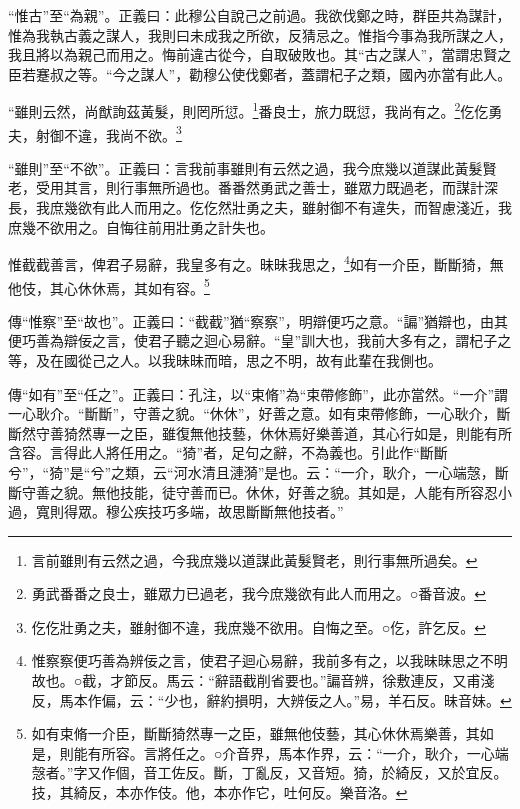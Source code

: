 {\noindent\shu{}\fzkt “惟古”至“為親”。正義曰：此穆公自說己之前過。我欲伐鄭之時，群臣共為謀計，惟為我執古義之謀人，我則曰未成我之所欲，反猜忌之。惟指今事為我所謀之人，我且將以為親己而用之。悔前違古從今，自取破敗也。其“古之謀人”，當謂忠賢之臣若蹇叔之等。“今之謀人”，勸穆公使伐鄭者，蓋謂杞子之類，國內亦當有此人。 \par}

“雖則云然，尚猷詢茲黃髮，則罔所愆。\footnote{言前雖則有云然之過，今我庶幾以道謀此黃髮賢老，則行事無所過矣。}番良士，旅力既愆，我尚有之。\footnote{勇武番番之良士，雖眾力已過老，我今庶幾欲有此人而用之。○番音波。}仡仡勇夫，射御不違，我尚不欲。\footnote{仡仡壯勇之夫，雖射御不違，我庶幾不欲用。自悔之至。○仡，許乞反。}


{\noindent\shu{}\fzkt “雖則”至“不欲”。正義曰：言我前事雖則有云然之過，我今庶幾以道謀此黃髮賢老，受用其言，則行事無所過也。番番然勇武之善士，雖眾力既過老，而謀計深長，我庶幾欲有此人而用之。仡仡然壯勇之夫，雖射御不有違失，而智慮淺近，我庶幾不欲用之。自悔往前用壯勇之計失也。 \par}

惟截截善言，俾君子易辭，我皇多有之。昧昧我思之，\footnote{惟察察便巧善為辨佞之言，使君子迴心易辭，我前多有之，以我昧昧思之不明故也。○截，才節反。馬云：“辭語截削省要也。”諞音辨，徐敷連反，又甫淺反，馬本作偏，云：“少也，辭約損明，大辨佞之人。”易，羊石反。昧音妹。}如有一介臣，斷斷猗，無他伎，其心休休焉，其如有容。\footnote{如有束脩一介臣，斷斷猗然專一之臣，雖無他伎藝，其心休休焉樂善，其如是，則能有所容。言將任之。○介音界，馬本作界，云：“一介，耿介，一心端愨者。”字又作個，音工佐反。斷，丁亂反，又音短。猗，於綺反，又於宜反。技，其綺反，本亦作伎。他，本亦作它，吐何反。樂音洛。}


{\noindent\zhuan{}\fzbyks 傳“惟察”至“故也”。正義曰：“截截”猶“察察”，明辯便巧之意。“諞”猶辯也，由其便巧善為辯佞之言，使君子聽之迴心易辭。“皇”訓大也，我前大多有之，謂杞子之等，及在國從己之人。以我昧昧而暗，思之不明，故有此輩在我側也。 \par}

{\noindent\zhuan{}\fzbyks 傳“如有”至“任之”。正義曰：孔注，以“束脩”為“束帶修飾”，此亦當然。“一介”謂一心耿介。“斷斷”，守善之貌。“休休”，好善之意。如有束帶修飾，一心耿介，斷斷然守善猗然專一之臣，雖復無他技藝，休休焉好樂善道，其心行如是，則能有所含容。言得此人將任用之。“猗”者，足句之辭，不為義也。引此作“斷斷兮”，“猗”是“兮”之類，云“河水清且漣漪”是也。云：“一介，耿介，一心端愨，斷斷守善之貌。無他技能，徒守善而已。休休，好善之貌。其如是，人能有所容忍小過，寬則得眾。穆公疾技巧多端，故思斷斷無他技者。” \par}

